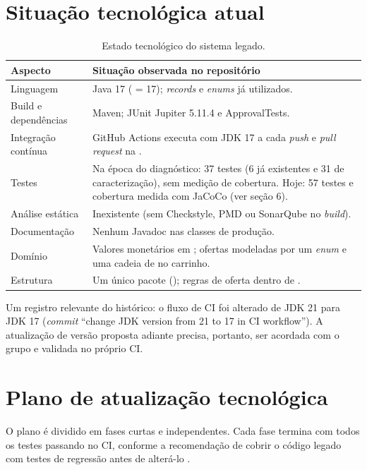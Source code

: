 \section{Situa\c{c}\~ao tecnol\'ogica atual}
\begin{table}[H]\centering\small
\begin{tabularx}{\textwidth}{>{\raggedright\arraybackslash}p{3.6cm}Y}
\toprule \textbf{Aspecto} & \textbf{Situa\c{c}\~ao observada no reposit\'orio} \\ \midrule
Linguagem & Java 17 ( = 17); \textit{records} e \textit{enums} j\'a utilizados. \\
Build e depend\^encias & Maven; JUnit Jupiter 5.11.4 e ApprovalTests. \\
Integra\c{c}\~ao cont\'inua & GitHub Actions executa  com JDK 17 a cada \textit{push} e \textit{pull request} na . \\
Testes & Na \'epoca do diagn\'ostico: 37 testes (6 j\'a existentes e 31 de caracteriza\c{c}\~ao), sem medi\c{c}\~ao de cobertura. Hoje: 57 testes e cobertura medida com JaCoCo (ver se\c{c}\~ao 6). \\
An\'alise est\'atica & Inexistente (sem Checkstyle, PMD ou SonarQube no \textit{build}). \\
Documenta\c{c}\~ao & Nenhum Javadoc nas classes de produ\c{c}\~ao. \\
Dom\'inio & Valores monet\'arios em ; ofertas modeladas por um \textit{enum} e uma cadeia de  no carrinho. \\
Estrutura & Um \'unico pacote (); regras de oferta dentro de . \\
\bottomrule\end{tabularx}
\caption{Estado tecnol\'ogico do sistema legado.}\end{table}

Um registro relevante do hist\'orico: o fluxo de CI foi alterado de JDK 21 para JDK 17 (\textit{commit} ``change JDK version from 21 to 17 in CI workflow''). A atualiza\c{c}\~ao de vers\~ao proposta adiante precisa, portanto, ser acordada com o grupo e validada no pr\'oprio CI.

\section{Plano de atualiza\c{c}\~ao tecnol\'ogica}
O plano \'e dividido em fases curtas e independentes. Cada fase termina com todos os testes passando no CI, conforme a recomenda\c{c}\~ao de cobrir o c\'odigo legado com testes de regress\~ao antes de alter\'a-lo \cite{feathers2013}.

